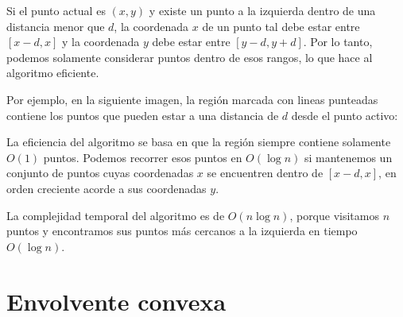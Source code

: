 Si el punto actual es $(x,y)$ y existe un punto a la izquierda dentro de una
distancia menor que $d$, la coordenada $x$ de un punto tal debe estar entre
$[x-d,x]$ y la coordenada $y$ debe estar entre $[y-d,y+d]$. Por lo tanto,
podemos solamente considerar puntos dentro de esos rangos, lo que hace al
algoritmo eficiente.

Por ejemplo, en la siguiente imagen, la región marcada con lineas punteadas
contiene los puntos que pueden estar a una distancia de $d$ desde el punto
activo:

\begin{center}
\end{center}

La eficiencia del algoritmo se basa en que la región siempre
contiene solamente $O(1)$ puntos. Podemos recorrer esos puntos en $O(\log n)$
si mantenemos un conjunto de puntos cuyas coordenadas $x$ se encuentren dentro
de $[x-d,x]$, en orden creciente acorde a sus coordenadas $y$.

La complejidad temporal del algoritmo es de $O(n \log n)$, porque visitamos
$n$ puntos y encontramos sus puntos más cercanos a la izquierda en tiempo
$O(\log n)$.

\section{Envolvente convexa}

